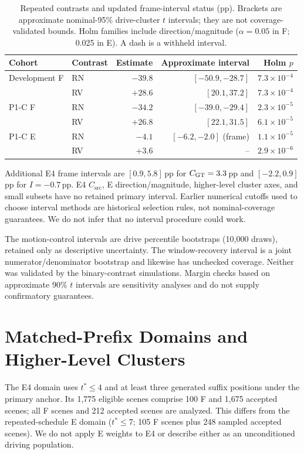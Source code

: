 \begin{table}[ht]
\centering\small
\caption{Repeated contrasts and updated frame-interval status (pp). Brackets are approximate nominal-95\% drive-cluster $t$ intervals; they are not coverage-validated bounds. Holm families include direction/magnitude ($\alpha=0.05$ in F; 0.025 in E). A dash is a withheld interval.}
\label{tab:repeated_full}
\begin{tabular}{@{}llrrr@{}}\toprule
Cohort & Contrast & Estimate & Approximate interval & Holm $p$\\\midrule
Development F & RN & $-39.8$ & $[-50.9,-28.7]$ & $7.3\times10^{-4}$\\
 & RV & $+28.6$ & $[20.1,37.2]$ & $7.3\times10^{-4}$\\
P1-C F & RN & $-34.2$ & $[-39.0,-29.4]$ & $2.3\times10^{-5}$\\
 & RV & $+26.8$ & $[22.1,31.5]$ & $6.1\times10^{-5}$\\
P1-C E & RN & $-4.1$ & $[-6.2,-2.0]$ (frame) & $1.1\times10^{-5}$\\
 & RV & $+3.6$ & -- & $2.9\times10^{-6}$\\\bottomrule
\end{tabular}
\end{table}

Additional E4 frame intervals are $[0.9,5.8]$\,pp for $C_{\mathrm{GT}}=3.3$\,pp and $[-2.2,0.9]$\,pp for $I=-0.7$\,pp. E4 $C_{\mathrm{src}}$, E direction/magnitude, higher-level cluster axes, and small subsets have no retained primary interval. Earlier numerical cutoffs used to choose interval methods are historical selection rules, not nominal-coverage guarantees. We do not infer that no interval procedure could work.

The motion-control intervals are drive percentile bootstraps (10,000 draws), retained only as descriptive uncertainty. The window-recovery interval is a joint numerator/denominator bootstrap and likewise has unchecked coverage. Neither was validated by the binary-contrast simulations. Margin checks based on approximate 90\% $t$ intervals are sensitivity analyses and do not supply confirmatory guarantees.

\section{Matched-Prefix Domains and Higher-Level Clusters}
\label{app:matched}
The E4 domain uses $t^*\leq4$ and at least three generated suffix positions under the primary anchor. Its 1,775 eligible scenes comprise 100 F and 1,675 accepted scenes; all F scenes and 212 accepted scenes are analyzed. This differs from the repeated-schedule E domain ($t^*\leq7$; 105 F scenes plus 248 sampled accepted scenes). We do not apply E weights to E4 or describe either as an unconditioned driving population.

